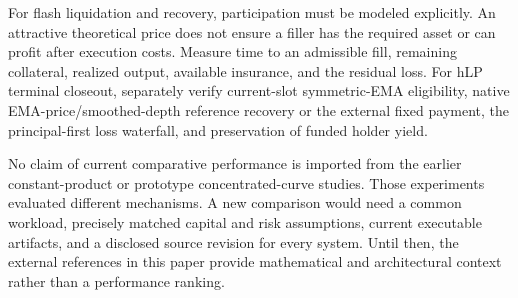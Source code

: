 For flash liquidation and recovery, participation must be modeled explicitly. An attractive theoretical price does not ensure a filler has the required asset or can profit after execution costs. Measure time to an admissible fill, remaining collateral, realized output, available insurance, and the residual loss. For hLP terminal closeout, separately verify current-slot symmetric-EMA eligibility, native EMA-price/smoothed-depth reference recovery or the external fixed payment, the principal-first loss waterfall, and preservation of funded holder yield.

No claim of current comparative performance is imported from the earlier constant-product or prototype concentrated-curve studies. Those experiments evaluated different mechanisms. A new comparison would need a common workload, precisely matched capital and risk assumptions, current executable artifacts, and a disclosed source revision for every system. Until then, the external references in this paper provide mathematical and architectural context rather than a performance ranking.

